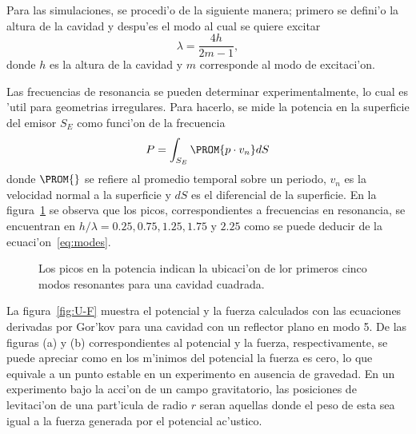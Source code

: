 Para las simulaciones, se procedi'o de la siguiente manera; primero se defini'o
la altura de la cavidad y despu'es el modo al cual se quiere excitar
\begin{equation}\label{eq:modes}
\lambda = \frac{4h}{2m-1},
\end{equation}
donde $h$ es la altura de la cavidad y $m$ corresponde al modo de excitaci'on.

Las frecuencias de resonancia se pueden determinar experimentalmente, lo cual
es 'util para geometrias irregulares. Para hacerlo, se mide la potencia en la 
superficie del emisor $S_E$ como funci'on de la frecuencia
\begin{equation}
P = \int_{S_E}\PROM{p\cdot v_n}dS
\end{equation}
donde $\PROM{}$ se refiere al promedio temporal sobre un periodo, $v_n$ es la
velocidad normal a la superficie y $dS$ es el diferencial de la superficie. En la 
figura~\ref{fig:resonancia-cuadrada} se observa que los picos, correspondientes 
a frecuencias en resonancia, se encuentran en $h/\lambda=0.25,0.75,1.25,1.75$ y $2.25$
como se puede deducir de la ecuaci'on~\ref{eq:modes}.


\begin{figure}[h]

\caption{\label{fig:resonancia-cuadrada}
Los picos en la potencia indican la ubicaci'on de lor primeros cinco modos resonantes para una cavidad cuadrada.
}
\end{figure}
La figura~\ref{fig:U-F} muestra el potencial  y la fuerza calculados con las ecuaciones 
derivadas por Gor'kov para una cavidad con un reflector plano en modo 5. De las
figuras (a) y (b) correspondientes al potencial y la fuerza, respectivamente, se puede
apreciar como en los m'inimos del potencial la fuerza es cero, lo que equivale a un
punto estable en un experimento en ausencia de gravedad. En un experimento bajo la
acci'on de un campo gravitatorio, las posiciones de levitaci'on de una part'icula de
radio $r$ seran aquellas donde el peso de esta sea igual a la fuerza generada por
el potencial ac'ustico. 


